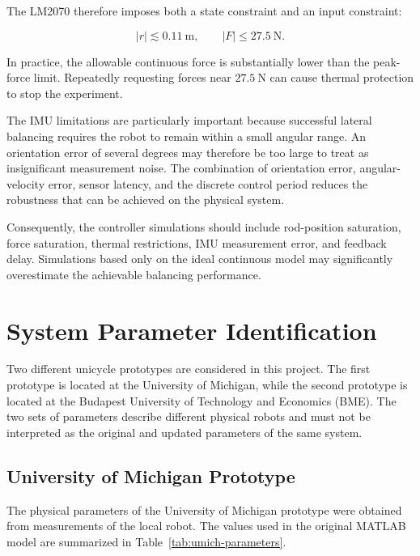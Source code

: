The LM2070 therefore imposes both a state constraint and an input constraint:

\begin{equation}
|r|\lesssim 0.11~\mathrm{m},
\qquad
|F|\leq 27.5~\mathrm{N}.
\end{equation}

In practice, the allowable continuous force is substantially lower than the peak-force limit. Repeatedly requesting forces near $27.5~\mathrm{N}$ can cause thermal protection to stop the experiment.

The IMU limitations are particularly important because successful lateral balancing requires the robot to remain within a small angular range. An orientation error of several degrees may therefore be too large to treat as insignificant measurement noise. The combination of orientation error, angular-velocity error, sensor latency, and the discrete control period reduces the robustness that can be achieved on the physical system.

Consequently, the controller simulations should include rod-position saturation, force saturation, thermal restrictions, IMU measurement error, and feedback delay. Simulations based only on the ideal continuous model may significantly overestimate the achievable balancing performance.

\section{System Parameter Identification}
\label{sec:system-parameter-identification}

Two different unicycle prototypes are considered in this project. The first prototype is located at the University of Michigan, while the second prototype is located at the Budapest University of Technology and Economics (BME). The two sets of parameters describe different physical robots and must not be interpreted as the original and updated parameters of the same system.

\subsection{University of Michigan Prototype}

The physical parameters of the University of Michigan prototype were obtained from measurements of the local robot. The values used in the original MATLAB model are summarized in Table~\ref{tab:umich-parameters}.

